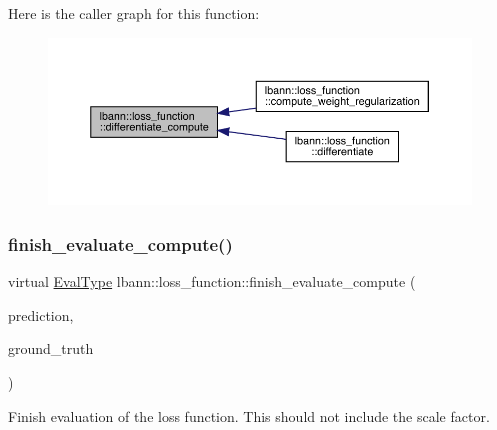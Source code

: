 Here is the caller graph for this function\+:\nopagebreak
\begin{figure}[H]
\begin{center}
\leavevmode
\includegraphics[width=350pt]{classlbann_1_1loss__function_aefccc2b4f5a02664002d12630cf369e7_icgraph}
\end{center}
\end{figure}
\mbox{\label{classlbann_1_1loss__function_a3ea8553a4e9c75477d7d4fc533c4d4fd}} 
\subsubsection{\texorpdfstring{finish\+\_\+evaluate\+\_\+compute()}{finish\_evaluate\_compute()}}
{\footnotesize\ttfamily virtual \hyperlink{base_8hpp_a3266f5ac18504bbadea983c109566867}{Eval\+Type} lbann\+::loss\+\_\+function\+::finish\+\_\+evaluate\+\_\+compute (\begin{DoxyParamCaption}\item[{const \hyperlink{base_8hpp_a9a697a504ae84010e7439ffec862b470}{Abs\+Dist\+Mat} \&}]{prediction,  }\item[{const \hyperlink{base_8hpp_a9a697a504ae84010e7439ffec862b470}{Abs\+Dist\+Mat} \&}]{ground\+\_\+truth }\end{DoxyParamCaption})\hspace{0.3cm}{\ttfamily [pure virtual]}}

Finish evaluation of the loss function. This should not include the scale factor. 

